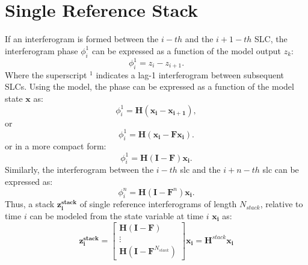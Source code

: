 \documentclass{article}
\begin{document}
\section{Single Reference Stack}
If an interferogram is formed between the $i-th$ and the $i + 1-th$ SLC, the interferogram phase $\phi_{i}^{1}$ can be expressed as a function of the model output $z_k$:
\begin{equation}
	\phi_{i}^{1} = z_{i} - z_{i + 1}.
\end{equation} 
Where the superscript $^1$ indicates a lag-1 interferogram between subsequent SLCs.
Using the model, the phase can be expressed as a function of the model state $\mathbf{x}$ as:
\begin{equation}
	\phi_{i}^1 = \mathbf{H} \left(\mathbf{x_{i}} - \mathbf{x_{i+1}}\right),
\end{equation}
or 
\begin{equation}
	\phi_{i}^1 = \mathbf{H} \left(\mathbf{x_i} - \mathbf{F}\mathbf{x_i}\right).
\end{equation}
or in a more compact form:
\begin{equation}
	\phi_{i}^1 =  \mathbf{H} \left(\mathbf{I} - \mathbf{F} \right) \mathbf{x_i}.
\end{equation}
Similarly, the interferogram between the $i-th$ slc and the $i+n-th$ slc can be expressed as:
\begin{equation}
	\phi_{i}^n =  \mathbf{H} \left(\mathbf{I} - \mathbf{F}^n\right) \mathbf{x_i}.
\end{equation}
Thus, a stack  $\mathbf{z_{i}^{stack}}$ of single reference interferograms of length $N_{stack}$, relative to time $i$ can be modeled from the state variable at time $i$ $\mathbf{x_{i}}$ as:
\begin{equation}
	\mathbf{z_{i}^{stack}} =\begin{bmatrix}
	 	\mathbf{H} \left(\mathbf{I} - \mathbf{F}\right)\\
	 	\vdots\\
	 	\mathbf{H} \left(\mathbf{I} - \mathbf{F}^{N_{stack}}\right) 
	\end{bmatrix}\mathbf{x_i} = \mathbf{H}^{stack} \mathbf{x_i}
\end{equation}
\end{document}
